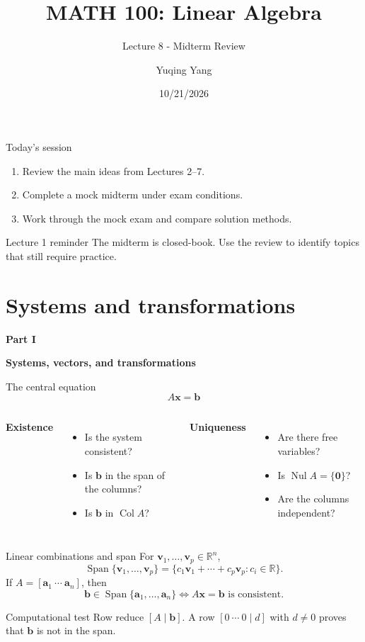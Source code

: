 \documentclass[aspectratio=169]{beamer}
\title{MATH 100: Linear Algebra}
\subtitle{Lecture 8 - Midterm Review}
\author{Yuqing Yang}
\institute{Macau University of Science and Technology}
\date{10/21/2026}
\newcommand{\R}{\mathbb{R}}
\newcommand{\vect}[1]{\mathbf{#1}}
\newcommand{\Span}{\operatorname{Span}}
\newcommand{\Col}{\operatorname{Col}}
\newcommand{\Nul}{\operatorname{Nul}}
\newcommand{\sectioncard}[2]{%
  \begin{frame}[plain]
    \vfill\centering
    {\Huge\color{lectureorange}\bfseries #1}\par\bigskip
    {\LARGE\color{lecturegreen}\bfseries #2}
    \vfill
  \end{frame}}
\begin{document}
\begin{frame}[plain]
  \titlepage
\end{frame}

\begin{frame}{Today's session}
\begin{enumerate}
  \item Review the main ideas from Lectures 2--7.
  \item Complete a mock midterm under exam conditions.
  \item Work through the mock exam and compare solution methods.
\end{enumerate}
\medskip
\begin{block}{Lecture 1 reminder}
The midterm is closed-book. Use the review to identify topics that still require practice.
\end{block}
\end{frame}

\section{Systems and transformations}
\sectioncard{Part I}{Systems, vectors, and transformations}

\begin{frame}{The central equation}
\centering
{\LARGE
\[
A\vect x=\vect b
\]}
\vspace{-1ex}
\begin{columns}[T]
\textbf{Existence}
\begin{itemize}
  \item Is the system consistent?
  \item Is $\vect b$ in the span of the columns?
  \item Is $\vect b$ in $\Col A$?
\end{itemize}
\textbf{Uniqueness}
\begin{itemize}
  \item Are there free variables?
  \item Is $\Nul A=\{\vect0\}$?
  \item Are the columns independent?
\end{itemize}
\end{columns}
\end{frame}

\begin{frame}{Linear combinations and span}
For $\vect v_1,\ldots,\vect v_p\in\R^n$,
\[
\Span\{\vect v_1,\ldots,\vect v_p\}
=\{c_1\vect v_1+\cdots+c_p\vect v_p:c_i\in\R\}.
\]
If $A=[\vect a_1\ \cdots\ \vect a_n]$, then
\[
\vect b\in\Span\{\vect a_1,\ldots,\vect a_n\}
\iff A\vect x=\vect b\text{ is consistent}.
\]
\begin{block}{Computational test}
Row reduce $[A\mid\vect b]$. A row $[0\ \cdots\ 0\mid d]$ with $d\ne0$ proves that $\vect b$ is not in the span.
\end{block}
\end{frame}
\end{document}

